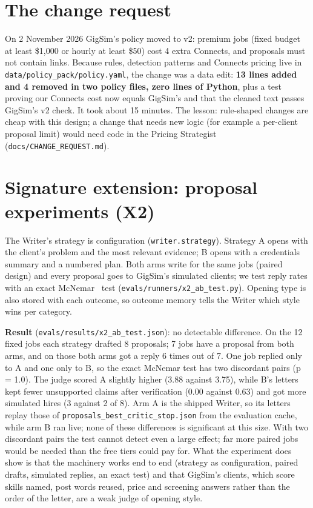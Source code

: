 \documentclass[10pt,a4paper]{article}
\newcommand{\file}[1]{\texttt{\small #1}}
\newcommand{\tablefrom}[2]{\begin{table}[h]\centering\caption{#2}\end{table}}
\begin{document}
\section{The change request}
On 2 November 2026 GigSim's policy moved to v2: premium jobs (fixed budget at least \$1,000 or hourly at least \$50)
cost 4 extra Connects, and proposals must not contain links. Because rules, detection patterns and Connects pricing
live in \file{data/policy\_pack/policy.yaml}, the change was a data edit: \textbf{13 lines added and 4 removed in two
policy files, zero lines of Python}, plus a test proving our Connects cost now equals GigSim's and that the cleaned
text passes GigSim's v2 check. It took about 15 minutes. The lesson: rule-shaped changes are cheap with this design;
a change that needs new logic (for example a per-client proposal limit) would need code in the Pricing Strategist
(\file{docs/CHANGE\_REQUEST.md}).

\section{Signature extension: proposal experiments (X2)}
The Writer's strategy is configuration (\texttt{writer.strategy}). Strategy A opens with the client's problem and the
most relevant evidence; B opens with a credentials summary and a numbered plan. Both arms write for the same jobs
(paired design) and every proposal goes to GigSim's simulated clients; we test reply rates with an exact McNemar~\cite{mcnemar1947}
test (\file{evals/runners/x2\_ab\_test.py}). Opening type is also stored with each outcome, so outcome memory tells
the Writer which style wins per category.
\tablefrom{x2}{A/B test of two proposal strategies (paired, same jobs).}
\textbf{Result} (\file{evals/results/x2\_ab\_test.json}): no detectable difference. On the 12 fixed jobs each strategy
drafted 8 proposals; 7 jobs have a proposal from both arms, and on those both arms got a reply 6 times out of 7. One
job replied only to A and one only to B, so the exact McNemar test has two discordant pairs (p = 1.0). The judge
scored A slightly higher (3.88 against 3.75), while B's letters kept fewer unsupported claims after verification (0.00
against 0.63) and got more simulated hires (3 against 2 of 8). Arm A is the shipped Writer, so its letters replay those
of \file{proposals\_best\_critic\_stop.json} from the evaluation cache, while arm B ran live; none of these differences
is significant at this size. With two discordant pairs the test cannot detect
even a large effect; far more paired jobs would be needed than the free tiers could pay for. What the experiment does show is that the machinery works end to end (strategy as
configuration, paired drafts, simulated replies, an exact test) and that GigSim's clients, which score skills named,
post words reused, price and screening answers rather than the order of the letter, are a weak judge of opening style.
\end{document}
